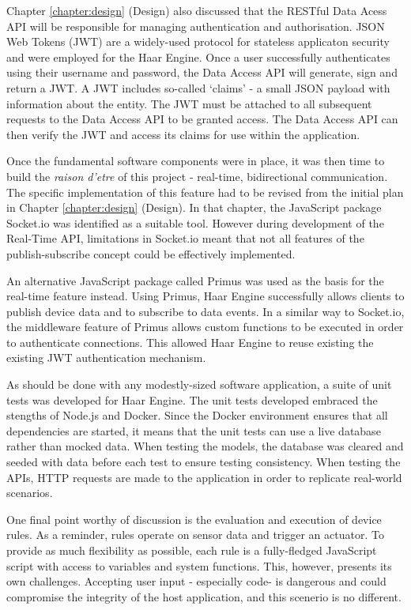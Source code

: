     Chapter \ref{chapter:design} (Design) also discussed that the RESTful Data Acess API will be responsible for managing authentication and authorisation. JSON Web Tokens (JWT) are a widely-used protocol for stateless applicaton security and were employed for the Haar Engine. Once a user successfully authenticates using their username and password, the Data Access API will generate, sign and return a JWT. A JWT includes so-called `claims' - a small JSON payload with information about the entity. The JWT must be attached to all subsequent requests to the Data Access API to be granted access. The Data Access API can then verify the JWT and access its claims for use within the application.

    Once the fundamental software components were in place, it was then time to build the \textit{raison d'etre} of this project - real-time, bidirectional communication. The specific implementation of this feature had to be revised from the initial plan in Chapter \ref{chapter:design} (Design). In that chapter, the JavaScript package Socket.io was identified as a suitable tool. However during development of the Real-Time API, limitations in Socket.io meant that not all features of the publish-subscribe concept could be effectively implemented.

    An alternative JavaScript package called Primus was used as the basis for the real-time feature instead. Using Primus, Haar Engine successfully allows clients to publish device data and to subscribe to data events. In a similar way to Socket.io, the middleware feature of Primus allows custom functions to be executed in order to authenticate connections. This allowed Haar Engine to reuse existing the existing JWT authentication mechanism.

    As should be done with any modestly-sized software application, a suite of unit tests was developed for Haar Engine. The unit tests developed embraced the stengths of Node.js and Docker. Since the Docker environment ensures that all dependencies are started, it means that the unit tests can use a live database rather than mocked data. When testing the models, the database was cleared and seeded with data before each test to ensure testing consistency. When testing the APIs, HTTP requests are made to the application in order to replicate real-world scenarios.

    One final point worthy of discussion is the evaluation and execution of device rules. As a reminder, rules operate on sensor data and trigger an actuator. To provide as much flexibility as possible, each rule is a fully-fledged JavaScript script with access to variables and system functions. This, however, presents its own challenges. Accepting user input - especially code- is dangerous and could compromise the integrity of the host application, and this scenerio is no different.

